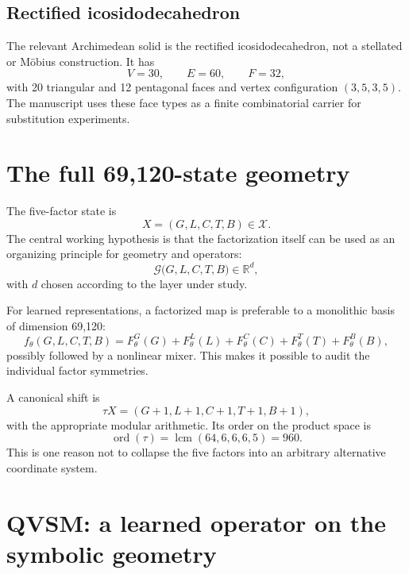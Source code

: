 \documentclass[11pt,a4paper]{article}
\numberwithin{equation}{section}
\newcommand{\R}{\mathbb{R}}
\newcommand{\XX}{\mathcal{X}}
\begin{document}
\subsection{Rectified icosidodecahedron}

The relevant Archimedean solid is the rectified icosidodecahedron, not a stellated or Möbius construction. It has
\[
V=30,\qquad E=60,\qquad F=32,
\]
with 20 triangular and 12 pentagonal faces and vertex configuration $(3,5,3,5)$. The manuscript uses these face types as a finite combinatorial carrier for substitution experiments.

\section{The full 69,120-state geometry}
\label{sec:fullspace}

The five-factor state is
\[
X=(G,L,C,T,B)\in\XX.
\]
The central working hypothesis is that the factorization itself can be used as an organizing principle for geometry and operators:
\begin{equation}
\mathcal G\bigl(G,L,C,T,B\bigr)
\in\R^d,
\end{equation}
with $d$ chosen according to the layer under study.

For learned representations, a factorized map is preferable to a monolithic basis of dimension 69,120:
\begin{equation}
f_\theta(G,L,C,T,B)=
F_\theta^G(G)+F_\theta^L(L)+F_\theta^C(C)+F_\theta^T(T)+F_\theta^B(B),
\label{eq:factorized}
\end{equation}
possibly followed by a nonlinear mixer. This makes it possible to audit the individual factor symmetries.

A canonical shift is
\begin{equation}
\tau X=(G+1,L+1,C+1,T+1,B+1),
\label{eq:unit-shift}
\end{equation}
with the appropriate modular arithmetic. Its order on the product space is
\begin{equation}
\operatorname{ord}(\tau)=\operatorname{lcm}(64,6,6,6,5)=960.
\end{equation}
This is one reason not to collapse the five factors into an arbitrary alternative coordinate system.

\section{QVSM: a learned operator on the symbolic geometry}
\label{sec:qvsm}
\end{document}
